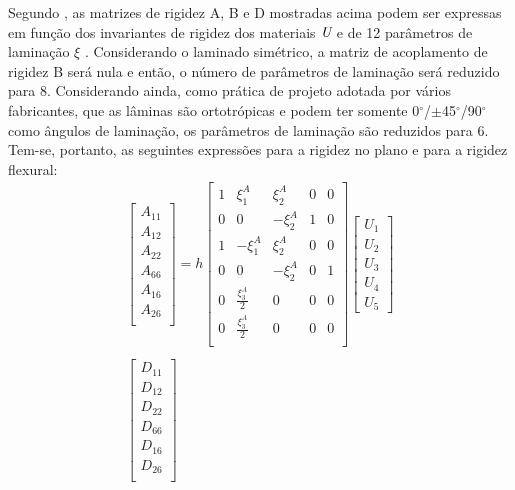 Segundo \cite{liu2004maximization}, as matrizes de rigidez A, B e D mostradas acima podem ser expressas em função dos invariantes de rigidez dos materiais $\emph{U}$ e de 12 parâmetros de laminação $\xi$ \cite{tsai1968invariant}. Considerando o laminado simétrico, a matriz de acoplamento de rigidez B será nula e então, o número de parâmetros de laminação será reduzido para 8. Considerando ainda, como prática de projeto adotada por vários fabricantes, que as lâminas são ortotrópicas e podem ter somente 0$^{\circ}$/$\pm$45$^{\circ}$/90$^{\circ}$ como ângulos de laminação, os parâmetros de laminação são reduzidos para 6. Tem-se, portanto, as seguintes expressões para a rigidez no plano e para a rigidez flexural:
\begin{equation} \label{A_matrix}
\begin{gathered}
\begin{bmatrix}
    A_{11} \\A_{12} \\A_{22} \\A_{66} \\A_{16} \\A_{26} \\
\end{bmatrix}
= h\begin{bmatrix}
		1 & \xi^A_1 & \xi^A_2 & 0 & 0 \\
		0 & 0 & -\xi^A_2 & 1 & 0 \\
    1 & -\xi^A_1 & \xi^A_2 & 0 & 0 \\
		0 & 0 & -\xi^A_2 & 0 & 1 \\
		0 & \frac{\xi^A_3}{2} & 0 & 0 & 0 \\
		0 & \frac{\xi^A_3}{2} & 0 & 0 & 0 \\
\end{bmatrix}
\begin{bmatrix}
    U_1\\U_2 \\U_3 \\U_4 \\U_5
\end{bmatrix}\\~\\
\begin{bmatrix}
    D_{11} \\D_{12} \\D_{22} \\D_{66} \\D_{16} \\D_{26} \\
\end{bmatrix}

\end{gathered}
\end{equation}
